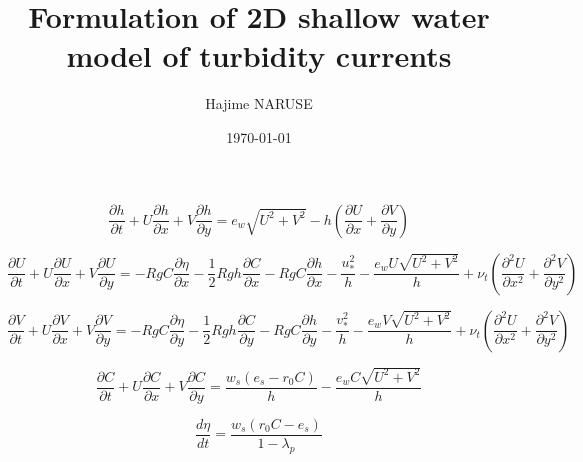 \documentclass[12pt]{article}
\title{Formulation of 2D shallow water model of turbidity currents}
\author{Hajime NARUSE}
\date{\today}
\begin{document}
\maketitle

\begin{equation}
\frac{\partial h}{\partial t} + U \frac{\partial h}{\partial x} + V \frac{\partial h}{\partial y} = e_w \sqrt{U^2 + V^2} - h \left( \frac{\partial U}{\partial x} + \frac{\partial V}{\partial y}  \right)
\label{eq flow_continuity}
\end{equation}

\begin{equation}
\frac{\partial U}{\partial t} + U \frac{\partial U}{\partial x} + V \frac{\partial U}{\partial y} = - R g C \frac{\partial \eta}{\partial x} - \frac{1}{2} R g h \frac{\partial C}{\partial x} - R g C \frac{\partial h}{\partial x} - \frac{u_{*}^2}{h} - \frac{e_w U \sqrt{U^2 + V^2}}{h} + \nu_t \left(\frac{\partial^2 U}{\partial x^2} + \frac{\partial^2 V}{\partial y^2} \right)
\label{eq flow_momentum_x}
\end{equation}

\begin{equation}
\frac{\partial V}{\partial t} + U \frac{\partial V}{\partial x} + V \frac{\partial V}{\partial y} = - R g C \frac{\partial \eta}{\partial y} - \frac{1}{2} R g h \frac{\partial C}{\partial y} - R g C \frac{\partial h}{\partial y} - \frac{v_{*}^2}{h} - \frac{e_w V \sqrt{U^2 + V^2}}{h} + \nu_t \left(\frac{\partial^2 U}{\partial x^2} + \frac{\partial^2 V}{\partial y^2} \right)
\label{eq flow_momentum_y}
\end{equation}

\begin{equation}
\frac{\partial C}{\partial t} + U \frac{\partial C}{\partial x} + V \frac{\partial C}{\partial y} = \frac{w_s (e_s - r_0 C)}{h} - \frac{e_w C \sqrt{U^2 + V^2}}{h}
\label{eq sediment_continuity}
\end{equation}

\begin{equation}
 \frac{d \eta}{d t} = \frac{w_s (r_0 C - e_s)}{1 - \lambda_p}
\label{eq exner}
\end{equation}
\end{document}
